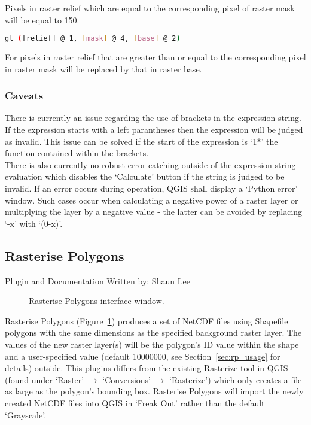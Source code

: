 Pixels in raster relief which are equal to the corresponding pixel of raster mask will be equal to 150.
\begin{example}
	\begin{lstlisting}[language=bash]
gt ([relief] @ 1, [mask] @ 4, [base] @ 2)
	\end{lstlisting}
\end{example}

For pixels in raster relief that are greater than or equal to the corresponding pixel in raster mask will be replaced by that in raster base. 
\label{sec:rastercalc}

\subsubsection{Caveats}
There is currently an issue regarding the use of brackets in the expression string. If the expression starts with a left parantheses then the expression will be judged as invalid. This issue can be solved if the start of the expression is `1*' the function contained within the brackets. \\

There is also currently no robust error catching outside of the expression string evaluation which disables the `Calculate' button if the string is judged to be invalid. If an error occurs during operation, QGIS shall display a `Python error' window. Such cases occur when calculating a negative power of a raster layer or multiplying the layer by a negative value - the latter can be avoided by replacing `-x' with `(0-x)'.


\subsection{Rasterise Polygons}
\label{sec:rasterisePolygons}

\small
\hfill Plugin and Documentation Written by: Shaun Lee

\normalsize

\begin{figure}[h!]
  \centering
  \caption{Rasterise Polygons interface window.}
  \label{fig:rp_window}
\end{figure}

Rasterise Polygons (Figure~\ref{fig:rp_window}) produces a set of NetCDF files using Shapefile polygons with the same dimensions as the specified background raster layer. The values of the new raster layer(s) will be the polygon's ID value within the shape and a user-specified value (default 10000000, see Section~\ref{sec:rp_usage} for details) outside. This plugins differs from the existing Rasterize tool in QGIS (found under `Raster' $\rightarrow$ `Conversions' $\rightarrow$ `Rasterize') which only creates a file as large as the polygon's bounding box. Rasterise Polygons will import the newly created NetCDF files into QGIS in `Freak Out' rather than the default `Grayscale'. \\

